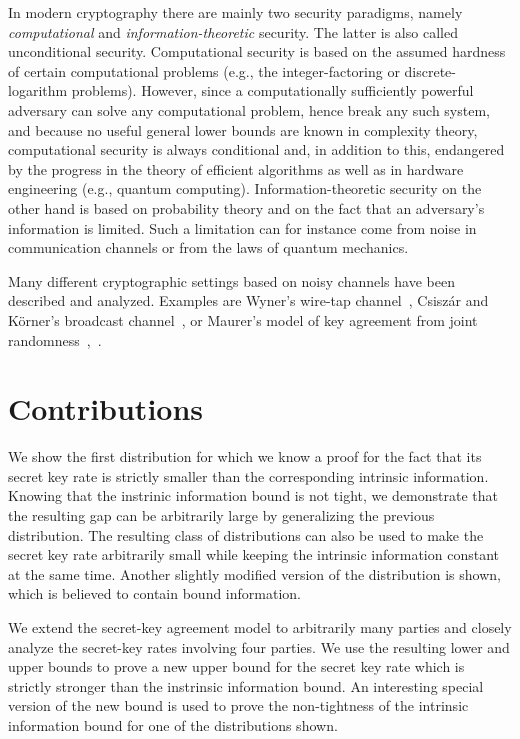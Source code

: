 \documentclass[a4paper, twoside, openany]{report}
\theoremstyle{plain}
\theoremstyle{definition}
\begin{document}
In modern cryptography there are mainly two security paradigms, namely \emph{computational} and \emph{information-theoretic} security.
The latter is also called unconditional security. Computational security is based on the assumed hardness of certain computational problems (e.g., the integer-factoring or dis\-crete-logarithm problems). However, since a computationally sufficiently powerful adversary can solve any computational problem, hence break any such system, and because no useful general lower bounds are known in complexity theory, computational security is always conditional and, in addition to this, endangered by the progress in the theory of efficient algorithms as well as in hardware engineering 
(e.g., quantum computing).
Information-theoretic security on the other hand is based on probability theory and on the fact that an adversary's information is limited. Such a limitation can for instance come from noise in communication channels or from the laws of quantum mechanics. 

Many different cryptographic settings based on noisy channels have been described and analyzed. Examples are Wyner's wire-tap channel~\cite{wyner75}, Csisz\'ar and K\"orner's broadcast channel~\cite{csikor78}, or Maurer's model of key agreement from joint randomness~\cite{ka},\, \cite{ittrans}.


\section{Contributions}

We show the first distribution for which we know a proof for the fact that its secret key rate is strictly smaller than the corresponding intrinsic information. Knowing that the instrinic information bound is not tight, we demonstrate that the resulting gap can be arbitrarily large by generalizing the previous distribution. The resulting class of distributions can also be used to make the secret key rate arbitrarily small while keeping the intrinsic information constant at the same time. Another slightly modified version of the distribution is shown, which is believed to contain bound information.

We extend the secret-key agreement model to arbitrarily many parties and closely analyze the secret-key rates involving four parties. We use the resulting lower and upper bounds to prove a new upper bound for the secret key rate which is strictly stronger than the instrinsic information bound. An interesting special version of the new bound is used to prove the non-tightness of the intrinsic information bound for one of the distributions shown.
\end{document}

